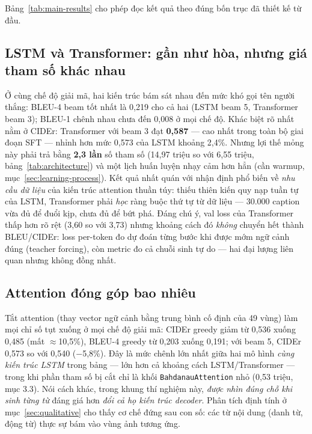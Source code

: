 Bảng~\ref{tab:main-results} cho phép đọc kết quả theo đúng bốn trục đã thiết kế
từ đầu.

\subsection{LSTM và Transformer: gần như hòa, nhưng giá tham số khác nhau}

Ở cùng chế độ giải mã, hai kiến trúc bám sát nhau đến mức khó gọi tên người
thắng: BLEU-4 beam tốt nhất là 0,219 cho cả hai (LSTM beam 5, Transformer
beam 3); BLEU-1 chênh nhau chưa đến 0,008 ở mọi chế độ. Khác biệt rõ nhất nằm ở
CIDEr: Transformer với beam 3 đạt \textbf{0,587} --- cao nhất trong toàn bộ giai
đoạn SFT --- nhỉnh hơn mức 0,573 của LSTM khoảng 2,4\%. Nhưng lợi thế mỏng này
phải trả bằng \textbf{2,3 lần} số tham số (14,97 triệu so với 6,55 triệu,
bảng~\ref{tab:architecture}) và một lịch huấn luyện nhạy cảm hơn hẳn (cần warmup,
mục~\ref{sec:learning-process}). Kết quả nhất quán với nhận định phổ biến về
\emph{nhu cầu dữ liệu} của kiến trúc attention thuần túy: thiếu thiên kiến quy
nạp tuần tự của LSTM, Transformer phải \emph{học} ràng buộc thứ tự từ dữ liệu
--- 30.000 caption vừa đủ để đuổi kịp, chưa đủ để bứt phá. Đáng chú ý, val
loss của Transformer thấp hơn rõ rệt (3,60 so với 3,73) nhưng khoảng cách đó
\emph{không} chuyển hết thành BLEU/CIDEr: loss per-token đo dự đoán từng bước
khi được mớm ngữ cảnh đúng (teacher forcing), còn metric đo cả chuỗi sinh tự do
--- hai đại lượng liên quan nhưng không đồng nhất.

\subsection{Attention đóng góp bao nhiêu}

Tắt attention (thay vector ngữ cảnh bằng trung bình cố định của 49 vùng) làm
mọi chỉ số tụt xuống ở mọi chế độ giải mã: CIDEr greedy giảm từ 0,536 xuống
0,485 (mất $\approx$10,5\%), BLEU-4 greedy từ 0,203 xuống 0,191; với beam 5,
CIDEr 0,573 so với 0,540 ($-$5,8\%). Đây là mức chênh lớn nhất giữa hai mô hình
\emph{cùng kiến trúc LSTM} trong bảng --- lớn hơn cả khoảng cách LSTM/Transformer
--- trong khi phần tham số bị cắt chỉ là khối \texttt{BahdanauAttention} nhỏ
(0,53 triệu, mục 3.3). Nói cách khác, trong khung thí nghiệm này, \emph{được
nhìn đúng chỗ khi sinh từng từ} đáng giá hơn \emph{đổi cả họ kiến trúc decoder}.
Phân tích định tính ở mục~\ref{sec:qualitative} cho thấy cơ chế đứng sau con số:
các từ nội dung (danh từ, động từ) thực sự bám vào vùng ảnh tương ứng.


